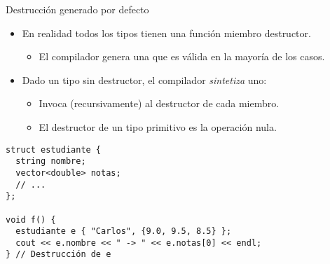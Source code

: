 \begin{frame}[fragile]{Destrucción generado por defecto}
\begin{itemize}
  \item En realidad todos los tipos tienen una función miembro destructor.
    \begin{itemize}
      \item El compilador genera una que es válida en la mayoría de los casos.
    \end{itemize}
  \item Dado un tipo sin destructor, el compilador \emph{sintetiza} uno:
    \begin{itemize}
      \item Invoca (recursivamente) al destructor de cada miembro.
      \item El destructor de un tipo primitivo es la operación nula.
    \end{itemize}
\end{itemize}
\begin{lstlisting}
struct estudiante {
  string nombre;
  vector<double> notas;
  // ...
};

void f() {
  estudiante e { "Carlos", {9.0, 9.5, 8.5} };
  cout << e.nombre << " -> " << e.notas[0] << endl;
} // Destrucción de e
\end{lstlisting}
\end{frame}
